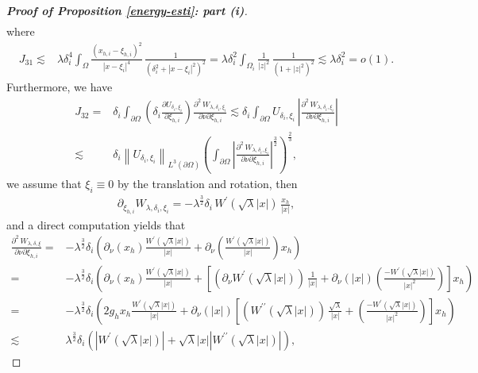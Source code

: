\documentclass[a4paper,reqno,11pt,oneside]{amsart}
\numberwithin{equation}{section}
\begin{document}
\begin{proof}[\textbf{Proof of Proposition \eqref{energy-esti}: part (i)}]
\begin{align*}
\end{align*}
where
\begin{align*}
    J_{31}\lesssim&\lambda\delta_i^4\displaystyle\int_{\Omega}\frac{(x_{h,i}-\xi_{h,i})^2}{|x-\xi_{i}|^4}\,\frac{1}{\left(\delta_i^2+|x-\xi_i|^2\right)^2}=\lambda\delta_i^2\displaystyle\int_{\Omega_i}\frac{1}{|z|^2}\,\frac{1}{\left(1+|z|^2\right)^2}\lesssim\lambda\delta_i^2=o(1).
\end{align*}
Furthermore,  we have
\begin{align*}
  J_{32}=&\delta_i  \displaystyle\int_{\partial\Omega}\left(\delta_i\frac{\partial U_{\delta_i,\xi_i}}{\partial \xi_{h,i}}\right)\frac{\partial^2\,W_{\lambda,\delta_i,\xi_i}}{\partial{\nu}\partial \xi_{h,i}}\lesssim\delta_i  \displaystyle\int_{\partial\Omega}U_{\delta_i,\xi_i}\,\left|\frac{\partial^2\,W_{\lambda,\delta_i,\xi_i}}{\partial{\nu}\partial \xi_{h,i}}\right|\\
  \lesssim&\delta_i\left\|U_{\delta_i,\xi_i}\right\|_{L^3(\partial\Omega)}\left(\displaystyle\int_{\partial\Omega}\left|\frac{\partial^2\,W_{\lambda,\delta_i,\xi_i}}{\partial{\nu}\partial \xi_{h,i}}\right|^{\frac{3}{2}}\right)^{\frac{2}{3}},
\end{align*}
{we assume that $\xi_i\equiv 0$ by the translation and rotation}, then 
\begin{align*}
    \partial_{\xi_{h,i}}W_{\lambda,\delta_{i},\xi_{i}}=-\lambda^{\frac{3}{2}}\delta_{i}\, W^{\prime}(\sqrt{\lambda}|x|)\,\frac{x_h}{|x|},
\end{align*}
and a direct computation yields that
\begin{align*}
    \frac{\partial^2\,W_{\lambda,\delta,\xi}}{\partial{\nu}\partial \xi_{h,i}}=&-\lambda^{\frac{3}{2}}\delta_{i}\left(\partial_{\nu}(x_h)\frac{ W^{\prime}(\sqrt{\lambda}|x|)}{|x|}+\partial_{\nu}\left(\frac{ W^{\prime}(\sqrt{\lambda}|x|)}{|x|}\right)x_h\right)\\
    =&-\lambda^{\frac{3}{2}}\delta_{i}\left(\partial_{\nu}(x_h)\frac{ W^{\prime}(\sqrt{\lambda}|x|)}{|x|}+\left[\left(\partial_{\nu}W^{\prime}(\sqrt{\lambda}|x|)\right)\,\frac{1}{|x|}+\partial_{\nu}\left(|x|\right)\left(\frac{-W^{\prime}(\sqrt{\lambda}|x|)}{|x|^2}\right)\right]x_h\right)\\
    =&-\lambda^{\frac{3}{2}}\delta_i\left(2g_hx_h\frac{ W^{\prime}(\sqrt{\lambda}|x|)}{|x|}+\partial_{\nu}\left(|x|\right)\left[\left(W^{\prime\prime}(\sqrt{\lambda}|x|)\right)\,\frac{\sqrt{\lambda}}{|x|}+\left(\frac{-W^{\prime}(\sqrt{\lambda}|x|)}{|x|^2}\right)\right]x_h\right)\\
    \lesssim&\lambda^{\frac{3}{2}}\delta_i\left(\left|W^{\prime}(\sqrt{\lambda}|x|)\right|+\sqrt{\lambda}|x|\left|W^{\prime\prime}(\sqrt{\lambda}|x|)\right|\right),

\end{align*}
\end{proof}
\end{document}
